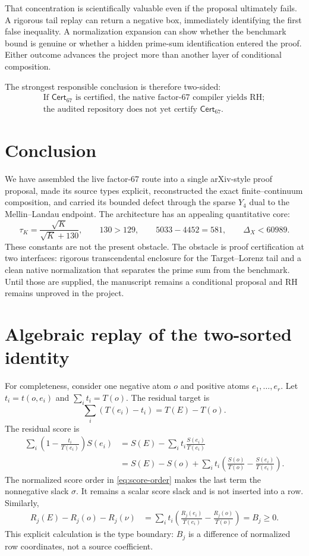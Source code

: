 \documentclass[11pt]{article}
\theoremstyle{definition}
\theoremstyle{remark}
\newcommand{\RH}{\mathrm{RH}}
\newcommand{\1}{\mathbf 1}
\newcommand{\Cert}{\mathsf{Cert}_{67}}
\begin{document}
That concentration is scientifically valuable even if the proposal ultimately fails.  A rigorous tail replay can return a negative box, immediately identifying the first false inequality.  A normalization expansion can show whether the benchmark bound is genuine or whether a hidden prime-sum identification entered the proof.  Either outcome advances the project more than another layer of conditional composition.

The strongest responsible conclusion is therefore two-sided:
\[
\boxed{
\begin{array}{c}
\text{If }\Cert\text{ is certified, the native factor-67 compiler yields }\RH;\\[2mm]
\text{the audited repository does not yet certify }\Cert.
\end{array}}
\]

\section{Conclusion}

We have assembled the live factor-67 route into a single arXiv-style proof proposal, made its source types explicit, reconstructed the exact finite--continuum composition, and carried its bounded defect through the sparse \(Y_4\) dual to the Mellin--Landau endpoint.  The architecture has an appealing quantitative core:
\[
\tau_K=\frac{\sqrt K}{\sqrt K+130},
\qquad
130>129,
\qquad
5033-4452=581,
\qquad
\Delta_X<60989.
\]
These constants are not the present obstacle.  The obstacle is proof certification at two interfaces: rigorous transcendental enclosure for the Target--Lorenz tail and a clean native normalization that separates the prime sum from the benchmark.  Until those are supplied, the manuscript remains a conditional proposal and \(\RH\) remains unproved in the project.

\appendix

\section{Algebraic replay of the two-sorted identity}\label{app:algebra}

For completeness, consider one negative atom \(o\) and positive atoms \(e_1,\dots,e_r\).  Let \(t_i=t(o,e_i)\) and \(\sum_i t_i=T(o)\).  The residual target is
\[
\sum_i\left(T(e_i)-t_i\right)=T(E)-T(o).
\]
The residual score is
\begin{align*}
\sum_i\left(1-\frac{t_i}{T(e_i)}\right)S(e_i)
&=S(E)-\sum_i t_i\frac{S(e_i)}{T(e_i)}\\
&=S(E)-S(o)
 +\sum_i t_i\left(\frac{S(o)}{T(o)}-\frac{S(e_i)}{T(e_i)}\right).
\end{align*}
The normalized score order in \eqref{eq:score-order} makes the last term the nonnegative slack \(\sigma\).  It remains a scalar score slack and is not inserted into a row.  Similarly,
\begin{align*}
R_j(E)-R_j(o)-R_j(\nu)
&=\sum_i t_i\left(\frac{R_j(e_i)}{T(e_i)}-\frac{R_j(o)}{T(o)}\right)=B_j\ge0.
\end{align*}
This explicit calculation is the type boundary: \(B_j\) is a difference of normalized row coordinates, not a source coefficient.
\end{document}
